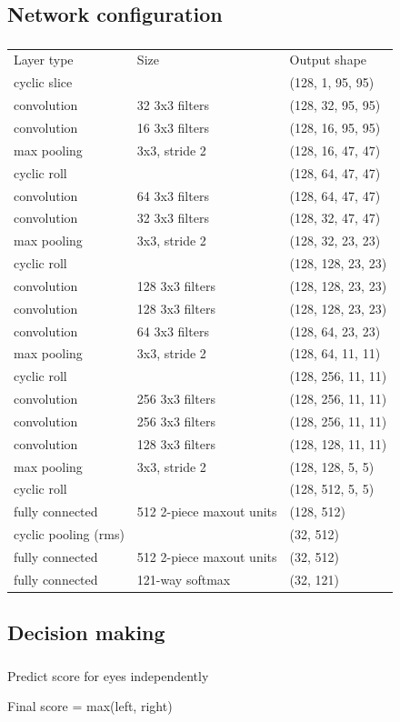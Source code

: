 \subsection{Network configuration}
\begin{frame}\frametitle{}

\begin{table}[]
\tiny	
\centering
\begin{tabular}{@{}lll@{}}
Layer type & Size & Output shape \\
cyclic slice &  & (128, 1, 95, 95) \\
convolution & 32 3x3 filters & (128, 32, 95, 95) \\
convolution & 16 3x3 filters & (128, 16, 95, 95) \\
max pooling & 3x3, stride 2 & (128, 16, 47, 47) \\
cyclic roll &  & (128, 64, 47, 47) \\
convolution & 64 3x3 filters & (128, 64, 47, 47) \\
convolution & 32 3x3 filters & (128, 32, 47, 47) \\
max pooling & 3x3, stride 2 & (128, 32, 23, 23) \\
cyclic roll &  & (128, 128, 23, 23) \\
convolution & 128 3x3 filters & (128, 128, 23, 23) \\
convolution & 128 3x3 filters & (128, 128, 23, 23) \\
convolution & 64 3x3 filters & (128, 64, 23, 23) \\
max pooling & 3x3, stride 2 & (128, 64, 11, 11) \\
cyclic roll &  & (128, 256, 11, 11) \\
convolution & 256 3x3 filters & (128, 256, 11, 11) \\
convolution & 256 3x3 filters & (128, 256, 11, 11) \\
convolution & 128 3x3 filters & (128, 128, 11, 11) \\
max pooling & 3x3, stride 2 & (128, 128, 5, 5) \\
cyclic roll &  & (128, 512, 5, 5) \\
fully connected & 512 2-piece maxout units & (128, 512) \\
cyclic pooling (rms) &  & (32, 512) \\
fully connected & 512 2-piece maxout units & (32, 512) \\
fully connected & 121-way softmax & (32, 121)
\end{tabular}
\end{table}
\end{frame}


\subsection{Decision making}

\begin{frame}\frametitle{}
\par Predict score for eyes independently
\par Final score = max(left, right)
\end{frame}


